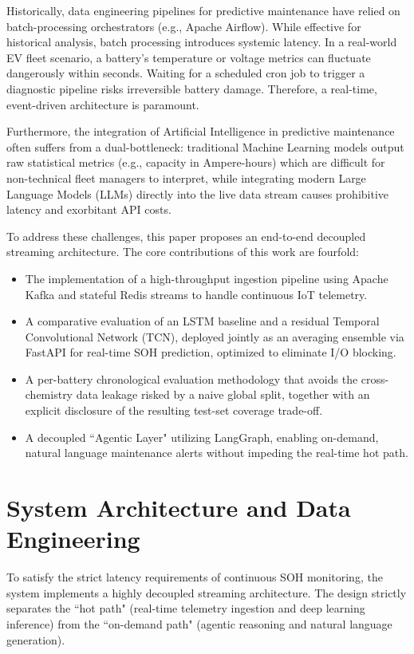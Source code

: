 Historically, data engineering pipelines for predictive maintenance have relied on batch-processing orchestrators (e.g., Apache Airflow). While effective for historical analysis, batch processing introduces systemic latency. In a real-world EV fleet scenario, a battery's temperature or voltage metrics can fluctuate dangerously within seconds. Waiting for a scheduled cron job to trigger a diagnostic pipeline risks irreversible battery damage. Therefore, a real-time, event-driven architecture is paramount.

Furthermore, the integration of Artificial Intelligence in predictive maintenance often suffers from a dual-bottleneck: traditional Machine Learning models output raw statistical metrics (e.g., capacity in Ampere-hours) which are difficult for non-technical fleet managers to interpret, while integrating modern Large Language Models (LLMs) directly into the live data stream causes prohibitive latency and exorbitant API costs.

To address these challenges, this paper proposes an end-to-end decoupled streaming architecture. The core contributions of this work are fourfold:
\begin{itemize}
    \item The implementation of a high-throughput ingestion pipeline using Apache Kafka and stateful Redis streams to handle continuous IoT telemetry.
    \item A comparative evaluation of an LSTM baseline and a residual Temporal Convolutional Network (TCN), deployed jointly as an averaging ensemble via FastAPI for real-time SOH prediction, optimized to eliminate I/O blocking.
    \item A per-battery chronological evaluation methodology that avoids the cross-chemistry data leakage risked by a naive global split, together with an explicit disclosure of the resulting test-set coverage trade-off.
    \item A decoupled ``Agentic Layer" utilizing LangGraph, enabling on-demand, natural language maintenance alerts without impeding the real-time hot path.
\end{itemize}

\section{\textbf{System Architecture and Data Engineering}}

To satisfy the strict latency requirements of continuous SOH monitoring, the system implements a highly decoupled streaming architecture. The design strictly separates the ``hot path" (real-time telemetry ingestion and deep learning inference) from the ``on-demand path" (agentic reasoning and natural language generation).

